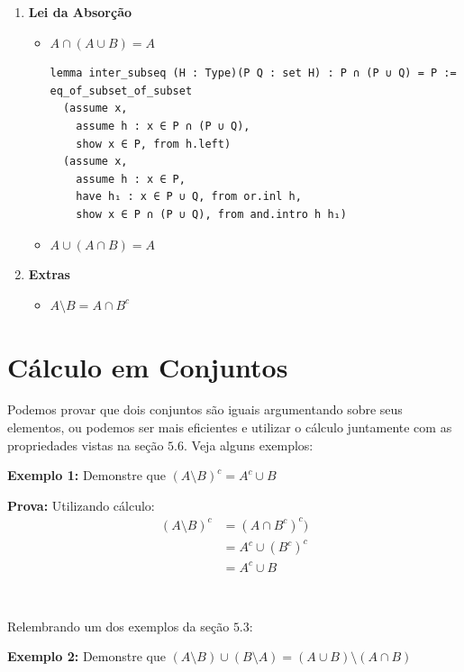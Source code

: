 \begin{enumerate}
\item{\textbf{Lei da Absorção}}
\begin{itemize}
\item $A \cap (A \cup B) = A$

\begin{lstlisting}
lemma inter_subseq (H : Type)(P Q : set H) : P ∩ (P ∪ Q) = P :=
eq_of_subset_of_subset
  (assume x,
    assume h : x ∈ P ∩ (P ∪ Q),
    show x ∈ P, from h.left)
  (assume x,
    assume h : x ∈ P,
    have h₁ : x ∈ P ∪ Q, from or.inl h,
    show x ∈ P ∩ (P ∪ Q), from and.intro h h₁)\end{lstlisting}

\item $A \cup (A \cap B) = A$
\end{itemize}

\item{\textbf{Extras}}
\begin{itemize}
\item $A \setminus B = A \cap B^c$
\end{itemize}
\end{enumerate}

\section{Cálculo em Conjuntos}
Podemos provar que dois conjuntos são iguais argumentando sobre seus elementos, ou podemos ser mais eficientes e utilizar o cálculo juntamente com as propriedades vistas na seção $5.6$. Veja alguns exemplos:

\textbf{Exemplo 1:} Demonstre que $(A \setminus B)^c = A^c \cup B$

\textbf{Prova:} Utilizando cálculo:
\begin{equation*}
\begin{aligned}
  (A \setminus B)^c &= (A \cap B^c)^c)\\
  &= A^c \cup (B^c)^c\\
  & = A^c \cup B
\end{aligned}
\end{equation*}

$\qquad$

Relembrando um dos exemplos da seção $5.3$:

\textbf{Exemplo 2:} Demonstre que $(A \setminus B) \cup (B \setminus A) = (A \cup B) \setminus (A \cap B)$

